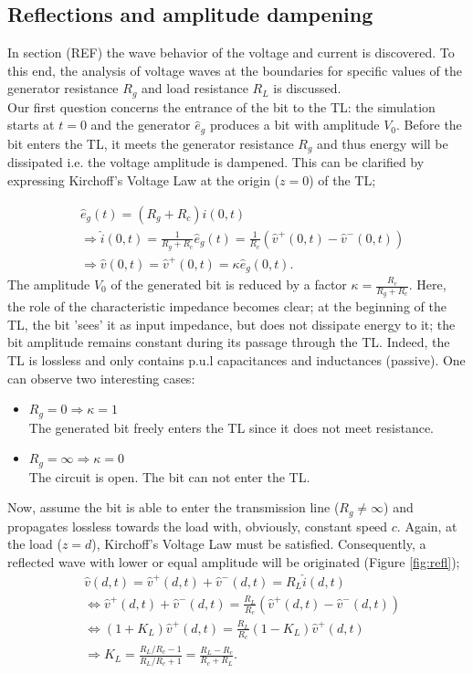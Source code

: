 \subsection{Reflections and amplitude dampening}

In section (REF) the wave behavior of the voltage and current is discovered. To this end, the analysis of voltage waves at the boundaries for specific values of the generator resistance $R_g$ and load resistance $R_L$ is discussed. \\

Our first question concerns the entrance of the bit to the TL: the simulation starts at $t=0$ and the generator $\hat{e}_g$ produces a bit with amplitude $V_0$. Before the bit enters the TL, it meets the generator resistance $R_g$ and thus energy will be dissipated i.e. the voltage amplitude is dampened. This can be clarified by expressing Kirchoff's Voltage Law at the origin ($z=0$) of the TL;

\begin{align}
&\hat{e}_g(t) = (R_g + R_c)\hat{i}(0, t) \\
&\Rightarrow \hat{i}(0, t) = \frac{1}{R_g+R_c}\hat{e}_g(t)= \frac{1}{R_c}(\hat{v}^{+}(0, t) - \hat{v}^{-}(0, t)) \\
&\Rightarrow \hat{v}(0, t) = \hat{v}^{+}(0, t) =\kappa\hat{e}_g(0, t)\label{enter}.
\end{align}
The amplitude $V_0$ of the generated bit is reduced by a factor $\kappa = \frac{R_c}{R_g + R_c}$. Here, the role of the characteristic impedance becomes clear; at the beginning of the TL, the bit 'sees' it as input impedance, but does not dissipate energy to it; the bit amplitude remains constant during its passage through the TL. Indeed, the TL is lossless and only contains p.u.l capacitances and inductances (passive). One can observe two interesting cases:
\begin{itemize}
\item $R_g = 0 \Rightarrow \kappa = 1$\\ The generated bit freely enters the TL since it does not meet resistance.
\item $R_g = \infty \Rightarrow \kappa = 0$ \\ The circuit is open. The bit can not enter the TL.
\end{itemize}

Now, assume the bit is able to enter the transmission line ($R_g \neq \infty$) and propagates lossless towards the load with, obviously, constant speed $c$. Again, at the load ($z=d$), Kirchoff's Voltage Law must be satisfied. Consequently, a reflected wave with lower or equal amplitude will be originated (Figure \ref{fig:refl});
\begin{align}
&\hat{v}(d, t) = \hat{v}^{+}(d, t) + \hat{v}^{-}(d, t) = R_L\hat{i}(d, t) \\
&\Leftrightarrow \hat{v}^{+}(d, t) + \hat{v}^{-}(d, t) = \frac{R_L}{R_c}(\hat{v}^{+}(d, t) - \hat{v}^{-}(d, t)) \\
&\Leftrightarrow (1 + K_L)\hat{v}^{+}(d, t) = \frac{R_L}{R_c}(1 - K_L)\hat{v}^{+}(d, t) \\
&\Rightarrow K_L = \frac{R_L/R_c - 1}{R_L/R_c + 1} = \frac{R_L - R_c}{R_c + R_L}.
\end{align}


